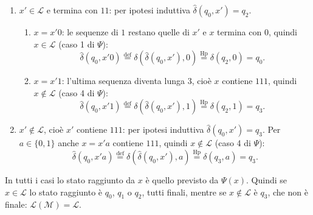\documentclass[a4paper, 11pt, oneside]{book}
\theoremstyle{formale}
\begin{document}
\begin{enumerate}
\begin{enumerate}[label=\arabic{enumi}\alph*.]
                \item $x = x'1$: l'ultima sequenza diventa lunga $2$, quindi $x \in \mathcal{L}$ e termina con $11$ (caso 3 di $\Psi$):
                    \begin{equation*}
                        \hat{\delta}(q_0, x'1)
                        \overset{\text{def}}{=} \delta(\hat{\delta}(q_0, x'), 1)
                        \overset{\text{Hp}}{=} \delta(q_1, 1) = q_2.
                    \end{equation*}
            \end{enumerate}
        \item $x' \in \mathcal{L}$ e termina con $11$: per ipotesi induttiva
            $\hat{\delta}(q_0, x') = q_2$.
            \begin{enumerate}[label=\arabic{enumi}\alph*.]
                \item $x = x'0$: le sequenze di $1$ restano quelle di $x'$ e $x$ termina con $0$, quindi $x \in \mathcal{L}$ (caso 1 di $\Psi$):
                    \begin{equation*}
                        \hat{\delta}(q_0, x'0)
                        \overset{\text{def}}{=} \delta(\hat{\delta}(q_0, x'), 0)
                        \overset{\text{Hp}}{=} \delta(q_2, 0) = q_0.
                    \end{equation*}
                \item $x = x'1$: l'ultima sequenza diventa lunga $3$, cio\`e $x$ contiene $111$, quindi $x \notin \mathcal{L}$ (caso 4 di $\Psi$):
                    \begin{equation*}
                        \hat{\delta}(q_0, x'1)
                        \overset{\text{def}}{=} \delta(\hat{\delta}(q_0, x'), 1)
                        \overset{\text{Hp}}{=} \delta(q_2, 1) = q_3.
                    \end{equation*}
            \end{enumerate}
        \item $x' \notin \mathcal{L}$, cio\`e $x'$ contiene $111$: per ipotesi induttiva
            $\hat{\delta}(q_0, x') = q_3$. Per $a \in \{0, 1\}$ anche $x = x'a$ contiene
            $111$, quindi $x \notin \mathcal{L}$ (caso 4 di $\Psi$):
            \begin{equation*}
                \hat{\delta}(q_0, x'a)
                \overset{\text{def}}{=} \delta(\hat{\delta}(q_0, x'), a)
                \overset{\text{Hp}}{=} \delta(q_3, a) = q_3.
            \end{equation*}
    \end{enumerate}
    In tutti i casi lo stato raggiunto da $x$ \`e quello previsto da $\Psi(x)$. Quindi se
    $x \in \mathcal{L}$ lo stato raggiunto \`e $q_0$, $q_1$ o $q_2$, tutti finali, mentre
    se $x \notin \mathcal{L}$ \`e $q_3$, che non \`e finale:
    $\mathcal{L}(\mathcal{M}) = \mathcal{L}$.
\end{document}
